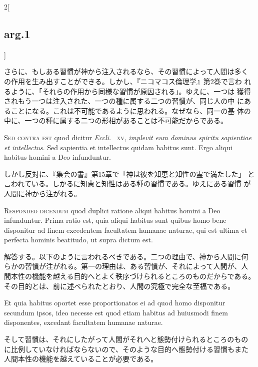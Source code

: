 \documentclass[paper=a4paper,fontsize=10pt,jafontsize=9pt,titlepage]{jlreq}
\begin{document}
\begin{paracol}{2}[\subsection{arg.1}]
\switchcolumn

さらに、もしある習慣が神から注入されるなら、その習慣によって人間は多く
の作用を生み出すことができる。しかし、『ニコマコス倫理学』第2巻で言わ
れるように、「それらの作用から同様な習慣が原因される」。ゆえに、一つは
獲得されもう一つは注入された、一つの種に属する二つの習慣が、同じ人の中
にあることになる。これは不可能であるように思われる。なぜなら、同一の基
体の中に、一つの種に属する二つの形相があることは不可能だからである。

\switchcolumn*[\subsection{s.c.}]

{\scshape Sed contra est} quod dicitur {\itshape Eccli}.~{\scshape
xv}, {\itshape implevit eum dominus spiritu sapientiae et
intellectus}. Sed sapientia et intellectus quidam habitus sunt. Ergo
aliqui habitus homini a Deo infunduntur.

\switchcolumn

しかし反対に、『集会の書』第15章で「神は彼を知恵と知性の霊で満たした」
と言われている。しかるに知恵と知性はある種の習慣である。ゆえにある習慣
が人間に神から注がれる。


{\scshape Respondeo dicendum} quod duplici ratione aliqui habitus
homini a Deo infunduntur. Prima ratio est, quia aliqui habitus sunt
quibus homo bene disponitur ad finem excedentem facultatem humanae
naturae, qui est ultima et perfecta hominis beatitudo, ut supra dictum
est.

\switchcolumn

解答する。以下のように言われるべきである。二つの理由で、神から人間に何
らかの習慣が注がれる。第一の理由は、ある習慣が、それによって人間が、人
間本性の機能を越える目的へとよく秩序づけられるところのものだからである。
その目的とは、前に述べられたとおり、人間の究極で完全な至福である。

\switchcolumn*

Et quia habitus oportet esse proportionatos ei ad quod homo disponitur
secundum ipsos, ideo necesse est quod etiam habitus ad huiusmodi finem
disponentes, excedant facultatem humanae naturae.

\switchcolumn

そして習慣は、それにしたがって人間がそれへと態勢付けられるところのもの
に比例していなければならないので、そのような目的へ態勢付ける習慣もまた
人間本性の機能を越えていることが必要である。


\end{paracol}
\end{document}
